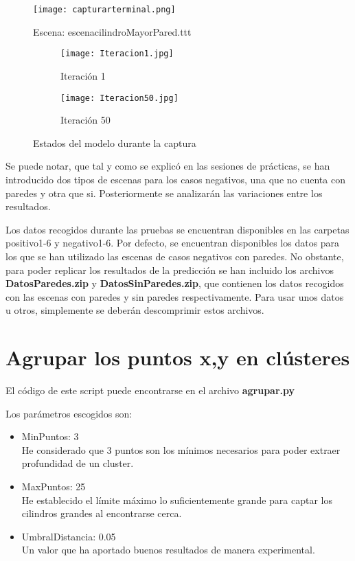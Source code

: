 \begin{figure}[H]
	\centering
	\texttt{[image: capturarterminal.png]}
	\caption{Escena: escenacilindroMayorPared.ttt}
\end{figure}

\begin{figure}[!htb]
   \begin{subfigure}{0.48\textwidth}
     \centering
     \texttt{[image: Iteracion1.jpg]}
     \caption{Iteración 1}
   \end{subfigure}\hfill
   \begin{subfigure}{0.48\textwidth}
     \centering
     \texttt{[image: Iteracion50.jpg]}
     \caption{Iteración 50}
	\end{subfigure}
	\caption{Estados del modelo durante la captura}
\end{figure}

Se puede notar, que tal y como se explicó en las sesiones de prácticas, se han introducido dos tipos de escenas para los casos negativos, una que no cuenta con paredes y otra que si. Posteriormente se analizarán las variaciones entre los resultados.

Los datos recogidos durante las pruebas se encuentran disponibles en las carpetas positivo1-6 y negativo1-6. Por defecto, se encuentran disponibles los datos para los que se han utilizado las escenas de casos negativos con paredes.
No obstante, para poder replicar los resultados de la predicción se han incluido los archivos \textbf{DatosParedes.zip} y \textbf{DatosSinParedes.zip}, que contienen los datos recogidos con las escenas con paredes y sin paredes respectivamente. Para usar unos datos u otros, simplemente se deberán descomprimir estos archivos.

\newpage

\section{Agrupar los puntos x,y en clústeres}

El código de este script puede encontrarse en el archivo \textbf{agrupar.py}

Los parámetros escogidos son:
\begin{itemize}
	\item MinPuntos: 3 \\ He considerado que 3 puntos son los mínimos necesarios para poder extraer profundidad de un cluster.
	\item MaxPuntos: 25 \\ He establecido el límite máximo lo suficientemente grande para captar los cilindros grandes al encontrarse cerca.
	\item UmbralDistancia: 0.05 \\ Un valor que ha aportado buenos resultados de manera experimental.
\end{itemize}

